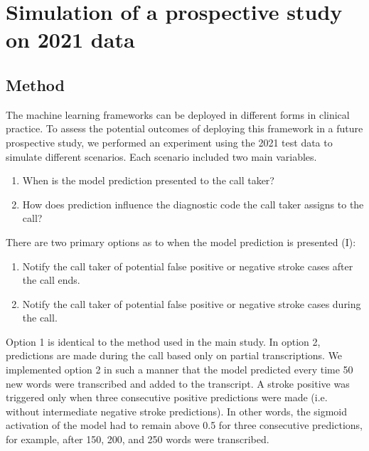 {\begin{table}[h]
{\begin{tabular}{l|ccccc}
        \bottomrule
    \end{tabular}%
    }
\end{table}


\section{Simulation of a prospective study on 2021 data}

\subsection{Method}

The machine learning frameworks can be deployed in different forms in clinical practice. To assess the potential outcomes of deploying this framework in a future prospective study, we performed an experiment using the 2021 test data to simulate different scenarios. Each scenario included two main variables.
%
\begin{enumerate}[label=\Roman*.]
    \item When is the model prediction presented to the call taker?
    \item How does prediction influence the diagnostic code the call taker assigns to the call?
\end{enumerate}
%
There are two primary options as to when the model prediction is presented (I):
%
\begin{enumerate}
    \item Notify the call taker of potential false positive or negative stroke cases after the call ends.
    \item Notify the call taker of potential false positive or negative stroke cases during the call.
\end{enumerate}
%
Option 1 is identical to the method used in the main study. In option 2, predictions are made during the call based only on partial transcriptions. We implemented option 2 in such a manner that the model predicted every time 50 new words were transcribed and added to the transcript. A stroke positive was triggered only when three consecutive positive predictions were made (i.e. without intermediate negative stroke predictions). In other words, the sigmoid activation of the model had to remain above 0.5 for three consecutive predictions, for example, after 150, 200, and 250 words were transcribed.

}
